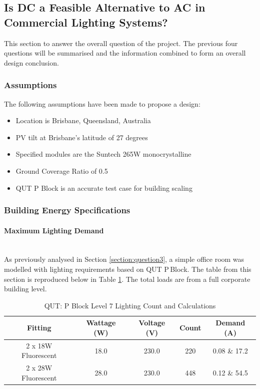 \subsection{Is DC a Feasible Alternative to AC in Commercial Lighting Systems?}

This section to answer the overall question of the project. The previous four questions will be summarised and the information combined to form an overall design conclusion.
 
\subsubsection{Assumptions} \label{section:sam-assumptions}

The following assumptions have been made to propose a design:

\begin{itemize}[noitemsep,nolistsep]
	\item Location is Brisbane, Queensland, Australia
	\item PV tilt at Brisbane's latitude of 27 degrees
	\item Specified modules are the Suntech 265W monocrystalline \cite{website:SuntechModule2}
	\item Ground Coverage Ratio of 0.5
	\item QUT P Block is an accurate test case for building scaling
\end{itemize}

\subsubsection{Building Energy Specifications}

\paragraph{Maximum Lighting Demand}
~\\
As previously analysed in Section \ref{section:question3}, a simple office room was modelled with lighting requirements based on QUT P\,Block. The table from this section is reproduced below in Table \ref{table:QUTlvl7-count2}. The total loads are from a full corporate building level.    

\begin{table}[!ht]
	\centering
	\renewcommand{\arraystretch}{2}
	\begin{tabular}{|c|c|c|c|c|}
		\hline
		\textbf{Fitting} & \textbf{Wattage (W)} & \textbf{Voltage (V)} & \textbf{Count} & \textbf{Demand (A)} \\ \hline
		2 x 18W Fluorescent & 18.0 & 230.0 & 220 &  0.08 \& 17.2 \\ \hline
		2 x 28W Fluorescent & 28.0 & 230.0 & 448 & 0.12 \& 54.5 \\ \hline
	\end{tabular}
	
	\caption{QUT: P Block Level 7 Lighting Count and Calculations}
	\label{table:QUTlvl7-count2}
\end{table} 

